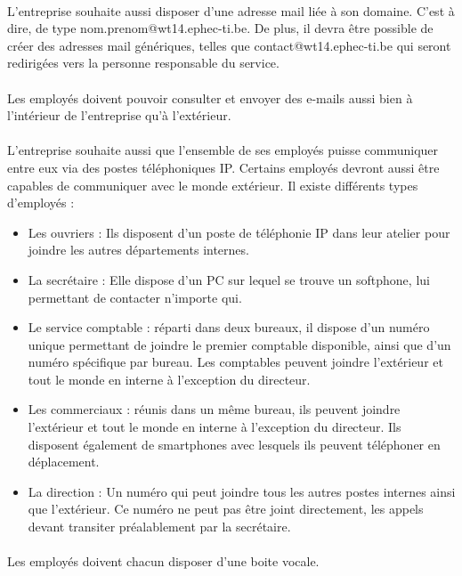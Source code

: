 \documentclass[a4paper,12pt]{article}
\begin{document}
	\paragraph{} L’entreprise souhaite aussi disposer d’une adresse mail liée à son domaine. C’est
à dire, de type nom.prenom@wt14.ephec-ti.be. De plus, il devra être possible de
créer des adresses mail génériques, telles que contact@wt14.ephec-ti.be qui seront
redirigées vers la personne responsable du service.
	\paragraph{} Les employés doivent pouvoir consulter et envoyer des e-mails aussi bien à l’intérieur
de l’entreprise qu’à l’extérieur.
	\paragraph{} L’entreprise souhaite aussi que l’ensemble de ses employés puisse communiquer
entre eux via des postes téléphoniques IP. Certains employés devront aussi être
capables de communiquer avec le monde extérieur. Il existe différents types d’employés
: \begin{itemize}
	\item Les ouvriers : Ils disposent d’un poste de téléphonie IP dans leur atelier pour
joindre les autres départements internes.
	\item La secrétaire : Elle dispose d’un PC sur lequel se trouve un softphone, lui permettant
de contacter n’importe qui.
	\item Le service comptable : réparti dans deux bureaux, il dispose d’un numéro unique
permettant de joindre le premier comptable disponible, ainsi que d’un numéro
spécifique par bureau. Les comptables peuvent joindre l’extérieur et tout le monde
en interne à l’exception du directeur.
	\item Les commerciaux : réunis dans un même bureau, ils peuvent joindre l’extérieur
et tout le monde en interne à l’exception du directeur. Ils disposent également de
smartphones avec lesquels ils peuvent téléphoner en déplacement.
	\item La direction : Un numéro qui peut joindre tous les autres postes internes ainsi
que l’extérieur. Ce numéro ne peut pas être joint directement, les appels devant
transiter préalablement par la secrétaire.
\end{itemize}
	\paragraph{} Les employés doivent chacun disposer d’une boite vocale.
	
\end{document}
